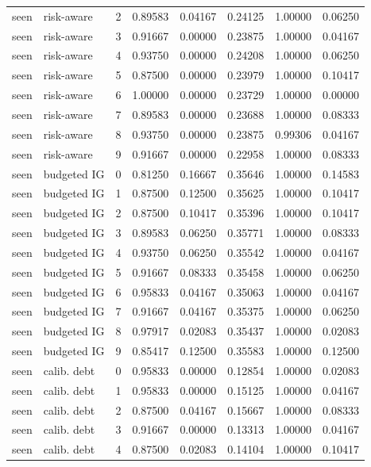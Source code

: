 \documentclass{article}
\begin{document}
\begin{center}
\begin{longtable}{llllllll}
seen & risk-aware & 2 & 0.89583 & 0.04167 & 0.24125 & 1.00000 & 0.06250 \\
seen & risk-aware & 3 & 0.91667 & 0.00000 & 0.23875 & 1.00000 & 0.04167 \\
seen & risk-aware & 4 & 0.93750 & 0.00000 & 0.24208 & 1.00000 & 0.06250 \\
seen & risk-aware & 5 & 0.87500 & 0.00000 & 0.23979 & 1.00000 & 0.10417 \\
seen & risk-aware & 6 & 1.00000 & 0.00000 & 0.23729 & 1.00000 & 0.00000 \\
seen & risk-aware & 7 & 0.89583 & 0.00000 & 0.23688 & 1.00000 & 0.08333 \\
seen & risk-aware & 8 & 0.93750 & 0.00000 & 0.23875 & 0.99306 & 0.04167 \\
seen & risk-aware & 9 & 0.91667 & 0.00000 & 0.22958 & 1.00000 & 0.08333 \\
seen & budgeted IG & 0 & 0.81250 & 0.16667 & 0.35646 & 1.00000 & 0.14583 \\
seen & budgeted IG & 1 & 0.87500 & 0.12500 & 0.35625 & 1.00000 & 0.10417 \\
seen & budgeted IG & 2 & 0.87500 & 0.10417 & 0.35396 & 1.00000 & 0.10417 \\
seen & budgeted IG & 3 & 0.89583 & 0.06250 & 0.35771 & 1.00000 & 0.08333 \\
seen & budgeted IG & 4 & 0.93750 & 0.06250 & 0.35542 & 1.00000 & 0.04167 \\
seen & budgeted IG & 5 & 0.91667 & 0.08333 & 0.35458 & 1.00000 & 0.06250 \\
seen & budgeted IG & 6 & 0.95833 & 0.04167 & 0.35063 & 1.00000 & 0.04167 \\
seen & budgeted IG & 7 & 0.91667 & 0.04167 & 0.35375 & 1.00000 & 0.06250 \\
seen & budgeted IG & 8 & 0.97917 & 0.02083 & 0.35437 & 1.00000 & 0.02083 \\
seen & budgeted IG & 9 & 0.85417 & 0.12500 & 0.35583 & 1.00000 & 0.12500 \\
seen & calib. debt & 0 & 0.95833 & 0.00000 & 0.12854 & 1.00000 & 0.02083 \\
seen & calib. debt & 1 & 0.95833 & 0.00000 & 0.15125 & 1.00000 & 0.04167 \\
seen & calib. debt & 2 & 0.87500 & 0.04167 & 0.15667 & 1.00000 & 0.08333 \\
seen & calib. debt & 3 & 0.91667 & 0.00000 & 0.13313 & 1.00000 & 0.04167 \\
seen & calib. debt & 4 & 0.87500 & 0.02083 & 0.14104 & 1.00000 & 0.10417 \\

\end{longtable}
\end{center}
\end{document}
